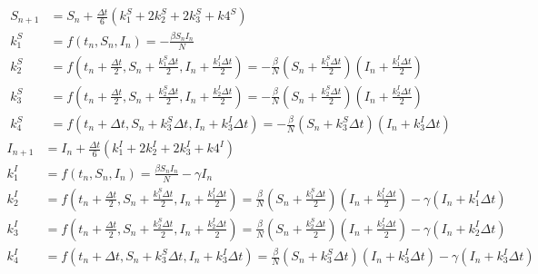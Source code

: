 \documentclass[a4paper]{article}
\begin{document}
        \begin{equation}\label{RK4-SIR-1}
            \begin{split}
                S_{n+1} & = S_n + \frac{\Delta t}{6}(k_1^S + 2k_2^S + 2k_3^S + k4^S) \\
                k_1^S & = f(t_n,S_n, I_n) = - \frac{\beta S_n I_n}{N} \\
                k_2^S & = f(t_n + \frac{\Delta t}{2}, S_n + \frac{k_1^S \Delta t}{2}, I_n + \frac{k_1^I \Delta t}{2}) = -\frac{\beta}{N} ( S_n + \frac{k_1^S \Delta t}{2})(I_n + \frac{k_1^I \Delta t}{2})  \\
                k_3^S & = f(t_n + \frac{\Delta t}{2}, S_n + \frac{k_2^S \Delta t}{2}, I_n + \frac{k_2^I \Delta t}{2}) = -\frac{\beta}{N} ( S_n + \frac{k_2^S \Delta t}{2})(I_n + \frac{k_2^I \Delta t}{2})  \\
                k_4^S & = f(t_n + \Delta t, S_n + k_3^S \Delta t, I_n + k_3^I \Delta t) = -\frac{\beta}{N} (S_n + k_3^S \Delta t)(I_n + k_3^I \Delta t)
            \end{split}
        \end{equation}
        \begin{equation}\label{RK4-SIR-2}
            \begin{split}
                I_{n+1} & = I_n + \frac{\Delta t}{6}(k_1^I+ 2k_2^I + 2k_3^I + k4^I) \\
                k_1^I & = f(t_n,S_n, I_n) = \frac{\beta S_n I_n}{N} - \gamma I_n \\
                k_2^I & = f(t_n + \frac{\Delta t}{2}, S_n + \frac{k_1^S \Delta t}{2}, I_n + \frac{k_1^I \Delta t}{2}) = \frac{\beta}{N} ( S_n + \frac{k_1^S \Delta t}{2})(I_n + \frac{k_1^I \Delta t}{2}) - \gamma (I_n + k_1^I \Delta t)  \\
                k_3^I & = f(t_n + \frac{\Delta t}{2}, S_n + \frac{k_2^S \Delta t}{2}, I_n + \frac{k_2^I \Delta t}{2}) = \frac{\beta}{N} ( S_n + \frac{k_2^S \Delta t}{2})(I_n + \frac{k_2^I \Delta t}{2}) - \gamma (I_n + k_2^I \Delta t)  \\
                k_4^I & = f(t_n + \Delta t, S_n + k_3^S \Delta t, I_n + k_3^I \Delta t) = \frac{\beta}{N} (S_n + k_3^S \Delta t)(I_n + k_3^I \Delta t) - \gamma (I_n + k_3^I \Delta t)
            \end{split}
        \end{equation}
\end{document}
